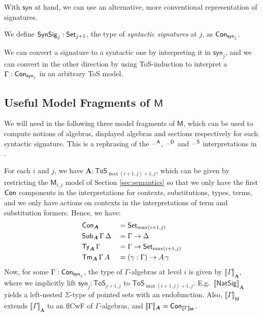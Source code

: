 \documentclass[sigplan,review,anonymous]{acmart}\settopmatter{printfolios=true,printccs=false,printacmref=false}
\newcommand{\ToS}{\mathsf{ToS}}
\newcommand{\NatSig}{\mathsf{NatSig}}
\newcommand{\syn}{\mathsf{syn}}
\newcommand{\SynSig}{\mathsf{SynSig}}
\newcommand{\bA}{\boldsymbol{A}}
\newcommand{\bM}{\boldsymbol{\mathsf{M}}}
\newcommand{\llb}{\llbracket}
\newcommand{\rrb}{\rrbracket}
\begin{document}
With $\syn$ at hand, we can use an alternative, more conventional representation of
signatures.

\begin{definition} We define $\SynSig_j : \Set_{j+1}$, the type of \emph{syntactic signatures} at $j$, as $\Con_{\syn_j}$.
\end{definition}

We can convert a signature to a syntactic one by interpreting it in $\syn_j$,
and we can convert in the other direction by using ToS-induction to interpret a
$\Gamma : \Con_{\syn_j}$ in an arbitrary ToS model.

\subsection{Useful Model Fragments of $\bM$}

We will need in the following three model fragments of $\bM$, which can be used
to compute notions of algebras, displayed algebras and sections respectively for
each syntactic signature. This is a rephrasing of the $\mathord{\hspace{1pt}\text{--}\hspace{1pt}}^{\mathsf{A}}$,
$\mathord{\hspace{1pt}\text{--}\hspace{1pt}}^{\mathsf{D}}$ and $\mathord{\hspace{1pt}\text{--}\hspace{1pt}}^{\mathsf{S}}$ interpretations in
\cite{kaposi2019constructing}.

\begin{definition}[The $\Set$ model of $\ToS$] For each $i$ and $j$, we have $\bA : \ToS_{\max(i+1, j)+1, j}$, which can be given by restricting the $\bM_{i,j}$ model
of Section \ref{sec:semantics} so that we only have the first $\mathsf{Con}$ components
in the interpretations for contexts, substitutions, types, terms, and we only
have actions on contexts in the interpretations of term and substitution
formers. Hence, we have:
\begin{alignat*}{3}
  & \Con_{\bA} && = \Set_{\max(i+1, j)} \\
  & \Sub_{\bA}\,\Gamma\,\Delta && = \Gamma \ra \Delta\\
  & \Ty_{\bA}\,\Gamma && = \Gamma \ra \Set_{\max(i+1, j)}\\
  & \Tm_{\bA}\,\Gamma\,A && = (\gamma : \Gamma) \ra A\,\gamma
\end{alignat*}
Now, for some $\Gamma : \Con_{\syn_j}$, the type of $\Gamma$-algebras at level
$i$ is given by $\llb\Gamma\rrb_{\bA}$, where we implicitly lift $\syn_j :
\ToS_{j+1, j}$ to $\ToS_{\max(i+1,j)+1, j}$. E.g.\, $\llb\NatSig\rrb_{\bA}$
yields a left-nested $\Sigma$-type of pointed sets with an endofunction. Also,
$\llb\Gamma\rrb_{\bM}$ extends $\llb\Gamma\rrb_{\bA}$ to an flCwF of
$\Gamma$-algebras, and $\llb\Gamma\rrb_{\bA} = \Con_{\llb\Gamma\rrb_{\bM}}$.
\end{definition}
\end{document}
